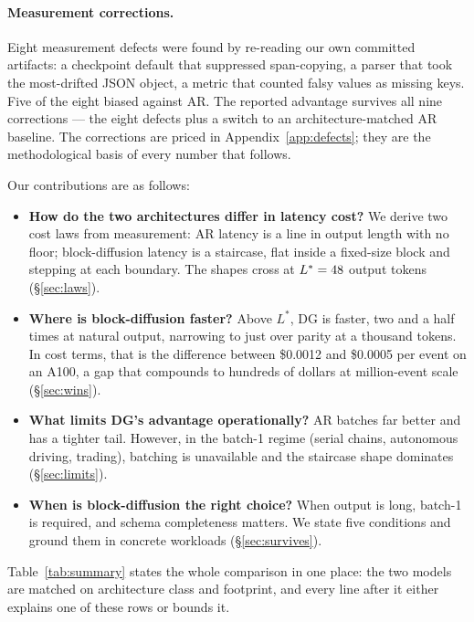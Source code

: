 \paragraph{Measurement corrections.}

Eight measurement defects were found by re-reading our own committed
artifacts: a checkpoint default that suppressed span-copying, a parser
that took the most-drifted JSON object, a metric that counted falsy
values as missing keys. Five of the eight biased against AR.
The reported advantage survives all nine corrections --- the eight
defects plus a switch to an architecture-matched AR baseline. The
corrections are priced in Appendix~\ref{app:defects}; they are the
methodological basis of every number that follows.

Our contributions are as follows:
\begin{itemize}[leftmargin=1.5em]
\item \textbf{How do the two architectures differ in latency cost?}
We derive two cost laws from measurement: AR latency is a line in output
length with no floor; block-diffusion latency is a staircase, flat inside
a fixed-size block and stepping at each boundary. The shapes cross at
$L^{*} = 48$ output tokens (\S\ref{sec:laws}).

\item \textbf{Where is block-diffusion faster?}
Above $L^{*}$, DG is faster, two and a half times at natural output,
narrowing to just over parity at a thousand tokens. In cost terms, that is the difference
between \$0.0012 and \$0.0005 per event on an A100, a gap that
compounds to hundreds of dollars at million-event scale
(\S\ref{sec:wins}).

\item \textbf{What limits DG's advantage operationally?}
AR batches far better and has a tighter tail. However, in the
batch-1 regime (serial chains, autonomous driving, trading), batching is
unavailable and the staircase shape dominates
(\S\ref{sec:limits}).

\item \textbf{When is block-diffusion the right choice?}
When output is long, batch-1 is required, and schema completeness
matters. We state five conditions and ground them in concrete
workloads (\S\ref{sec:survives}).
\end{itemize}

Table~\ref{tab:summary} states the whole comparison in one place: the
two models are matched on architecture class and footprint, and every
line after it either explains one of these rows or bounds it.

